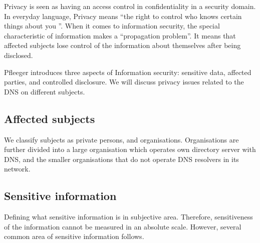 Privacy is seen as having an access control in confidentiality in a security domain.
In everyday language, Privacy means ``the right to control who knows certain things about you \cite{securityincomputing}''.
When it comes to information security, the special characteristic of information makes a ``propagation problem''.
It means that affected subjects lose control of the information about themselves after being disclosed.

Pfleeger introduces three aspects of Information security: sensitive data, affected parties, and controlled disclosure.
We will discuss privacy issues related to the DNS on different subjects.

\subsection{Affected subjects}
We classify subjects as private persons, and organisations. Organisations are further divided into a large organisation which operates own directory server with DNS, and the smaller organisations that do not operate DNS resolvers in its network.

\subsection{Sensitive information}
Defining what sensitive information is in subjective area.
Therefore, sensitiveness of the information cannot be measured in an absolute scale. However, several common area of sensitive information follows.